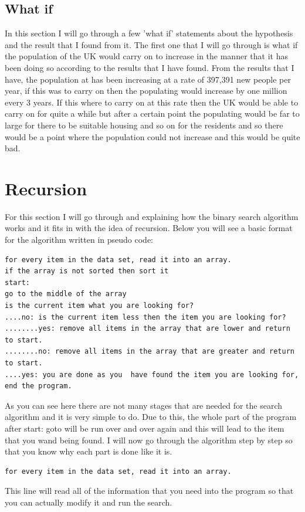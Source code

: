 \documentclass{article}
\begin{document}
\subsection{What if}
In this section I will go through a few 'what if' statements about the hypothesis and the result that I found from it. The first one that I will go through is what if the population of the UK would carry on to increase in the manner that it has been doing so according to the results that I have found. From the results that I have, the population at has been increasing at a rate of 397,391 new people per year, if this was to carry on then the populating would increase by one million every 3 years. If this where to carry on at this rate then the UK would be able to carry on for quite a while but after a certain point the populating would be far to large for there to be suitable housing and so on for the residents and so there would be a point where the population could not increase and this would be quite bad. 
\section{Recursion}
For this section I will go through and explaining how the binary search algorithm works and it fits in with the idea of recursion. Below you will see a basic format for the algorithm written in pseudo code:

\begin{verbatim}
for every item in the data set, read it into an array. 
if the array is not sorted then sort it
start:
go to the middle of the array 
is the current item what you are looking for?
....no: is the current item less then the item you are looking for?
........yes: remove all items in the array that are lower and return to start.
........no: remove all items in the array that are greater and return to start.
....yes: you are done as you  have found the item you are looking for, end the program. 
\end{verbatim}
As you can see here there are not many stages that are needed for the search algorithm and it is very simple to do. Due to this, the whole part of the program after start: goto will be run over and over again and this will lead to the item that you wand being found. I will now go through the algorithm step by step so that you know why each part is done like it is. 

\begin{verbatim}
for every item in the data set, read it into an array. 
\end{verbatim}
This line will read all of the information that you need into the program so that you can actually modify it and run the search. 
\end{document}
